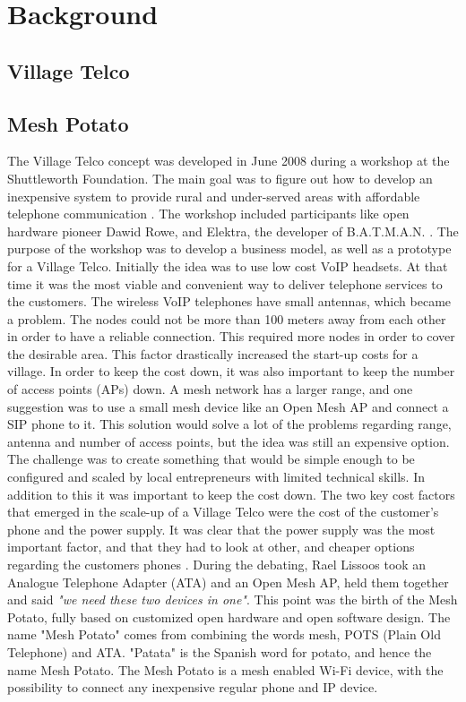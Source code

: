 \chapter{Background}
\label{chp:background} 

\section{Village Telco}


\section{Mesh Potato}

The Village Telco concept was developed in June 2008 during a workshop at the Shuttleworth Foundation. The main goal was to figure out how to develop an inexpensive system to provide rural and under-served areas with affordable telephone communication \cite{MParticle}. The workshop included participants like open hardware pioneer Dawid Rowe, and Elektra, the developer of B.A.T.M.A.N. \cite{MPworkshop}. The purpose of the workshop was to develop a business model, as well as a prototype for a Village Telco. Initially the idea was to use low cost VoIP headsets. At that time it was the most viable and convenient way to deliver telephone services to the customers. The wireless VoIP telephones have small antennas, which became a problem. The nodes could not be more than 100 meters away from each other in order to have a reliable connection. This  required more nodes in order to cover the desirable area. This factor drastically increased the start-up costs for a village. In order to keep the cost down, it was also important to keep the number of access points (APs) down. A mesh network has a larger range, and one suggestion was to use a small mesh device like an Open Mesh AP and connect a SIP phone to it. This solution would solve a lot of the problems regarding range, antenna and number of access points, but the idea was still an expensive option. The challenge was to create something that would be simple enough to be configured and scaled by local entrepreneurs with limited technical skills. In addition to this it was important to keep the cost down. The two key cost factors that emerged in the scale-up of a Village Telco were the cost of the customer's phone and the power supply. It was clear that the power supply was the most important factor, and that they had to look at other, and cheaper options regarding the customers phones \cite{MPworkshop}. During the debating, Rael Lissoos took an Analogue Telephone Adapter (ATA) and an Open Mesh AP, held them together and said \textit{"we need these two devices in one"}. This point was the birth of the Mesh Potato, fully based on customized open hardware and open software design. The name "Mesh Potato" comes from combining the words mesh, POTS (Plain Old Telephone) and ATA. "Patata" is the Spanish word for potato, and hence the name Mesh Potato. The Mesh Potato is a mesh enabled Wi-Fi device, with the possibility to connect any inexpensive regular phone and IP device. \cite{MPorigin}

